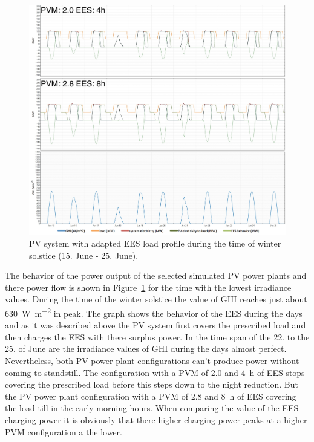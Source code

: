 \begin{figure}[!bhtp]  
\centering
\includegraphics[width=1\linewidth]{FIG/PV_winter_load}
\caption[PV system with adapted EES load profile during the time of winter solstice.]{PV system with adapted EES load profile during the time of winter solstice (15. June - 25. June).}\label{PV_winter_load}
\end{figure}
The behavior of the power output of the selected simulated PV power plants and there power flow is shown in Figure~\ref{PV_winter_load} for the time with the lowest irradiance values. During the time of the winter solstice the value of GHI reaches just about \SI{630}{\watt\per\square\metre} in peak. The graph shows the behavior of the EES during the days and as it was described above the PV system first covers the prescribed load and then charges the EES with there surplus power. In the time span of the 22. to the 25. of June are the irradiance values of GHI during the days almost perfect. Nevertheless, both PV power plant configurations can't produce power without coming to standstill. The configuration with a PVM of 2.0 and \SI{4}{h} of EES stops covering the prescribed load before this steps down to the night reduction. But the PV power plant configuration with a PVM of 2.8 and \SI{8}{h} of EES covering the load till in the early morning hours. When comparing the value of the EES charging power it is obviously that there higher charging power peaks at a higher PVM configuration a the lower. 

